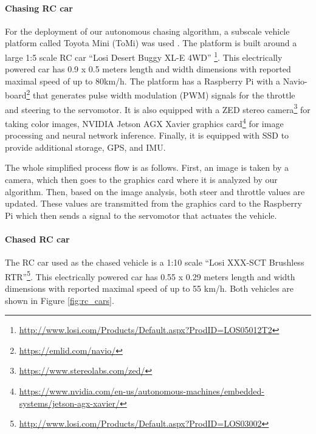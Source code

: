 \documentclass{ctuthesis/ctuthesis}
\begin{document}
\paragraph{Chasing RC car}
For the deployment of our autonomous chasing algorithm, a subscale vehicle platform called Toyota Mini (ToMi) was used \cite{tomi_Cech2020}. The platform is built around a large 1:5 scale RC car ``Losi Desert Buggy XL-E 4WD'' \footnote{\href{http://www.losi.com/Products/Default.aspx?ProdID=LOS05012T2}{http://www.losi.com/Products/Default.aspx?ProdID=LOS05012T2}}. This electrically powered car has 0.9 x 0.5 meters length and width dimensions with reported maximal speed of up to 80km/h. The platform has a Raspberry Pi with a Navio-board\footnote{\href{https://emlid.com/navio/}{https://emlid.com/navio/}} that generates pulse width modulation (PWM) signals for the throttle and steering to the servomotor. It is also equipped with a ZED stereo camera\footnote{\href{https://www.stereolabs.com/zed/}{https://www.stereolabs.com/zed/}} for taking color images, NVIDIA Jetson AGX Xavier graphics card\footnote{\href{https://www.nvidia.com/en-us/autonomous-machines/embedded-systems/jetson-agx-xavier/}{https://www.nvidia.com/en-us/autonomous-machines/embedded-systems/jetson-agx-xavier/}} for image processing and neural network inference. Finally, it is equipped with SSD to provide additional storage, GPS, and IMU. \par
The whole simplified process flow is as follows. First, an image is taken by a camera, which then goes to the graphics card where it is analyzed by our algorithm. Then, based on the image analysis, both steer and throttle values are updated. These values are transmitted from the graphics card to the Raspberry Pi which then sends a signal to the servomotor that actuates the vehicle.

\paragraph{Chased RC car}
The RC car used as the chased vehicle is a 1:10 scale ``Losi XXX-SCT Brushless RTR''\footnote{\href{http://www.losi.com/Products/Default.aspx?ProdID=LOS03002}{http://www.losi.com/Products/Default.aspx?ProdID=LOS03002}}. This electrically powered car has 0.55 x 0.29 meters length and width dimensions with reported maximal speed of up to 55 km/h. Both vehicles are shown in Figure \ref{fig:rc_cars}.
\end{document}
